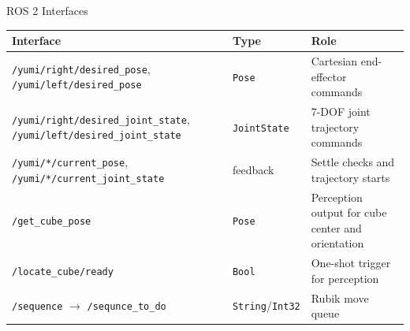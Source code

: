 \documentclass[10pt,aspectratio=169]{beamer}
\begin{document}
\begin{frame}{ROS 2 Interfaces}
  \begin{table}
    \centering
    \small
    \begin{tabular}{p{}p{}p{}}
      \toprule
      Interface & Type & Role \\
      \midrule
      \texttt{/yumi/right/desired\_pose}, \texttt{/yumi/left/desired\_pose} & \texttt{Pose} & Cartesian end-effector commands \\
      \texttt{/yumi/right/desired\_joint\_state}, \texttt{/yumi/left/desired\_joint\_state} & \texttt{JointState} & 7-DOF joint trajectory commands \\
      \texttt{/yumi/*/current\_pose}, \texttt{/yumi/*/current\_joint\_state} & feedback & Settle checks and trajectory starts \\
      \texttt{/get\_cube\_pose} & \texttt{Pose} & Perception output for cube center and orientation \\
      \texttt{/locate\_cube/ready} & \texttt{Bool} & One-shot trigger for perception \\
      \texttt{/sequence} $\rightarrow$ \texttt{/sequnce\_to\_do} & \texttt{String}/\texttt{Int32} & Rubik move queue \\
      \bottomrule
    \end{tabular}
  \end{table}
\end{frame}
\end{document}
